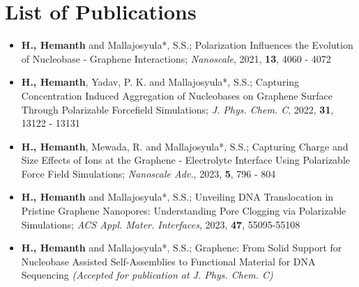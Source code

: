\section{List of Publications}
\begin{itemize}
    \item \textbf{H., Hemanth} and Mallajosyula*, S.S.; Polarization Influences the Evolution of Nucleobase - Graphene Interactions; {\textit{Nanoscale}, 2021, \textbf{13}, 4060 - 4072}
    \item \textbf{H., Hemanth}, Yadav, P. K. and Mallajosyula*, S.S.; Capturing Concentration Induced Aggregation of Nucleobases on Graphene Surface Through Polarizable Forcefield Simulations; {\textit{J. Phys. Chem. C}, 2022, \textbf{31}, 13122 - 13131}
    \item \textbf{H., Hemanth}, Mewada, R. and Mallajosyula*, S.S.; Capturing Charge and Size Effects of Ions at the Graphene - Electrolyte Interface Using Polarizable Force Field Simulations; {\textit{Nanoscale Adv.}, 2023, \textbf{5}, 796 - 804}
    \item \textbf{H., Hemanth} and Mallajosyula*, S.S.; Unveiling DNA Translocation in Pristine Graphene Nanopores: Understanding Pore Clogging via Polarizable Simulations; {\textit{ACS Appl. Mater. Interfaces}, 2023, \textbf{47}, 55095-55108} 
    \item \textbf{H., Hemanth} and Mallajosyula*, S.S.; Graphene: From Solid Support for Nucleobase Assisted Self-Assemblies to Functional Material for DNA Sequencing \textit{(Accepted for publication at J. Phys. Chem. C)} 
\end{itemize}

